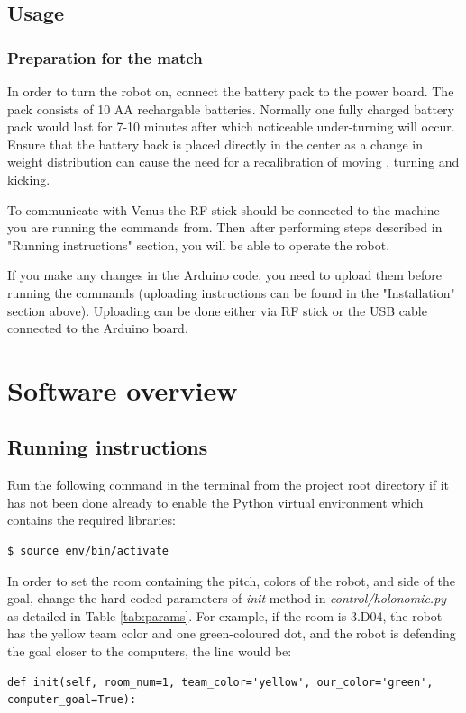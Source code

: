 \documentclass[a4paper,12pt]{article}
\begin{document}
\subsection{Usage}

\subsubsection{Preparation for the match}

In order to turn the robot on, connect the battery pack to the power board. The pack consists of 10 AA rechargable batteries. Normally one fully charged battery pack would last for 7-10 minutes after which noticeable under-turning will occur. Ensure that the battery back is placed directly in the center as a change in weight distribution can cause the need for a recalibration of moving , turning and kicking.

To communicate with Venus the RF stick should be connected to the machine you are running the commands from. Then after performing steps described in "Running instructions" section, you will be able to operate the robot.

If you make any changes in the Arduino code, you need to upload them before running the commands (uploading instructions can be found in the "Installation" section above). Uploading can be done either via RF stick or the USB cable connected to the Arduino board. 

\section{Software overview}

\subsection{Running instructions}

Run the following command in the terminal from the project root directory if it has not been done already to enable the Python virtual environment which contains the required libraries:
\begin{lstlisting}
$ source env/bin/activate
\end{lstlisting}

In order to set the room containing the pitch, colors of the robot, and side of the goal, change the hard-coded parameters of \textit{init} method in \textit{control/holonomic.py} as detailed in Table \ref{tab:params}.
For example, if the room is 3.D04, the robot has the yellow team color and one green-coloured dot, and the robot is defending the goal closer to the computers, the line would be:
\begin{lstlisting}
def init(self, room_num=1, team_color='yellow', our_color='green', computer_goal=True):
\end{lstlisting}
\end{document}
